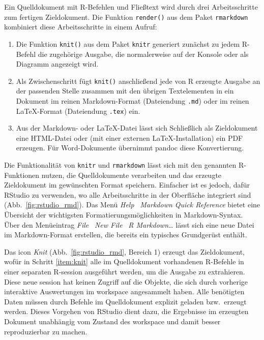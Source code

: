 Ein Quelldokument mit R-Befehlen und Fließtext wird durch drei Arbeitsschritte zum fertigen Zieldokument. Die Funktion \lstinline!render()! aus dem Paket \lstinline!rmarkdown! kombiniert diese Arbeitsschritte in einem Aufruf:
\begin{enumerate}
\item \label{item:knit} Die Funktion \lstinline!knit()! aus dem Paket \lstinline!knitr! generiert zunächst zu jedem R-Befehl die zugehörige Ausgabe, die normalerweise auf der Konsole oder als Diagramm angezeigt wird.
\item Als Zwischenschritt fügt \lstinline!knit()! anschließend jede von R erzeugte Ausgabe an der passenden Stelle zusammen mit den übrigen Textelementen in ein Dokument im reinen Markdown-Format (Dateiendung \lstinline!.md!) oder im reinen \LaTeX-Format (Dateiendung \lstinline!.tex!) ein.
\item Aus der Markdown- oder \LaTeX-Datei lässt sich Schließlich als Zieldokument eine HTML-Datei oder (mit einer externen \LaTeX-Installation) ein PDF erzeugen. Für Word-Dokumente übernimmt pandoc diese Konvertierung.
\end{enumerate}

Die Funktionalität von \lstinline!knitr! und \lstinline!rmarkdown! lässt sich mit den genannten R-Funktionen nutzen, die Quelldokumente verarbeiten und das erzeugte Zieldokument im gewünschten Format speichern. Einfacher ist es jedoch, dafür RStudio zu verwenden, wo alle Arbeitsschritte in der Oberfläche integriert sind (Abb.\ \ref{fig:rstudio_rmd}). Das Menü \emph{Help} \textrightarrow\ \emph{Markdown Quick Reference} bietet eine Übersicht der wichtigsten Formatierungsmöglichkeiten in Markdown-Syntax. Über den Menüeintrag \emph{File} \textrightarrow\ \emph{New File} \textrightarrow\ \emph{R Markdown\ldots} lässt sich eine neue Datei im Markdown-Format erstellen, die bereits ein typisches Grundgerüst enthält.

Das icon \emph{Knit} (Abb.\ \ref{fig:rstudio_rmd}, Bereich 1) erzeugt das Zieldokument, wofür in Schritt \ref{item:knit} alle im Quelldokument vorhandenen R-Befehle in einer separaten R-session ausgeführt werden, um die Ausgabe zu extrahieren. Diese neue session hat keinen Zugriff auf die Objekte, die sich durch vorherige interaktive Auswertungen im workspace angesammelt haben. Alle benötigten Daten müssen durch Befehle im Quelldokument explizit geladen bzw.\ erzeugt werden. Dieses Vorgehen von RStudio dient dazu, die Ergebnisse im erzeugten Dokument unabhängig vom Zustand des workspace und damit besser reproduzierbar zu machen.

